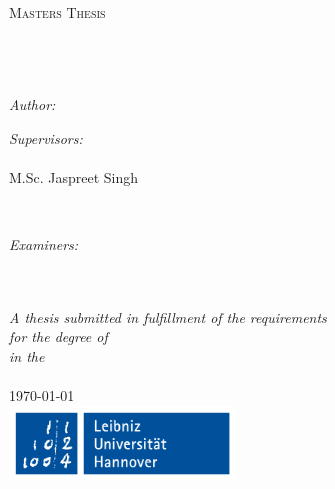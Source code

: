 \documentclass[11pt, oneside]{Thesis} %
\begin{document}
\begin{titlepage}
\begin{center}

\textsc{\LARGE \univname}\\[1.5cm] %
\textsc{\Large Masters Thesis}\\[0.5cm] %

\HRule \\[0.4cm] %
{\huge \bfseries \ttitle}\\[0.4cm] %
\HRule \\[1.5cm] %
 
\begin{minipage}{0.4\textwidth}
\begin{flushleft} \large
\emph{Author:}\\
\href{}{\authornames} %
\end{flushleft}
\end{minipage}
\begin{minipage}{0.4\textwidth}
\begin{flushright} \large
\emph{Supervisors:} \\
\href{}{\supname} \\ %
M.Sc. Jaspreet Singh
\end{flushright}
\end{minipage}\\[1cm]
\begin{minipage}{0.8\textwidth}
\begin{flushright} \large
\emph{Examiners:} \\
\href{}{\supname} \\ %
\href{}{\examname}
\end{flushright}
\end{minipage}\\[2cm]
 
\large \textit{A thesis submitted in fulfillment of the requirements\\ for the degree of \degreename}\\[0.3cm] %
\textit{in the}\\[0.4cm]

\deptname\\[2cm] %
 
{\large \today}\\[1cm] %
\includegraphics[width=6cm]{./Figures/uni_hannover.png} %
 
\vfill
\end{center}

\end{titlepage}
\end{document}
